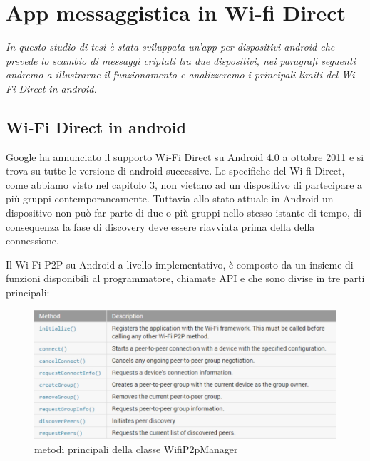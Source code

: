 \chapter{App messaggistica in Wi-fi Direct}

\begin{minipage}{12cm}\textit{In questo studio di tesi è stata sviluppata un'app per
    dispositivi android che prevede lo scambio di messaggi criptati tra due dispositivi, 
    nei paragrafi seguenti andremo a illustrarne il funzionamento e analizzeremo
    i principali limiti del Wi-Fi Direct in android.}
\end{minipage}




\section{Wi-Fi Direct in android}



Google ha annunciato il supporto Wi-Fi Direct su Android 4.0 a ottobre 2011 
\cite{wikiDi} e si trova su tutte le versione di android successive.
Le specifiche del Wi-fi Direct, come abbiamo visto nel capitolo 3,
non vietano ad un dispositivo di partecipare a più gruppi contemporaneamente.
Tuttavia allo stato attuale in Android  un dispositivo non 
può far parte di due o più gruppi
nello stesso istante di tempo,
di consequenza la fase di discovery deve essere riavviata 
prima della della connessione.

Il Wi-Fi P2P su Android a livello implementativo, è composto da un insieme di
funzioni disponibili al programmatore, chiamate API e che sono divise in tre parti
principali:

\begin{figure}
    \centering
    \caption{metodi principali della classe WifiP2pManager}
    \includegraphics[width=1\columnwidth]{imgs/wifip2pmanagerMet.jpg} 
\end{figure}

